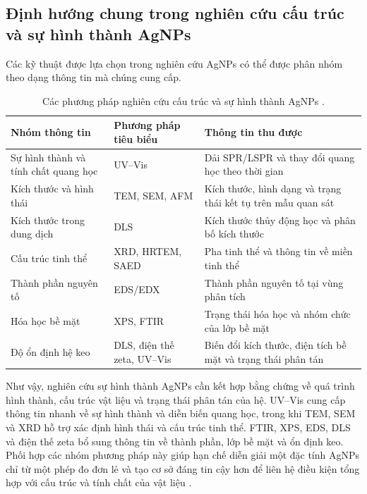 \subsection{Định hướng chung trong nghiên cứu cấu trúc và sự hình thành AgNPs}
Các kỹ thuật được lựa chọn trong nghiên cứu AgNPs có thể được phân nhóm theo dạng thông tin mà chúng cung cấp.
\begin{longtable}{@{}>{\raggedright\arraybackslash}p{}>{\raggedright\arraybackslash}p{}>{\raggedright\arraybackslash}p{}@{}}
\caption[Các phương pháp nghiên cứu cấu trúc và sự hình thành AgNPs]{Các phương pháp nghiên cứu cấu trúc và sự hình thành AgNPs \parencite{patil2021,pryshchepa2020,zhang2016}.}\\
Nhóm thông tin & Phương pháp tiêu biểu & Thông tin thu được \\
\hline
Sự hình thành và tính chất quang học & UV--Vis & Dải SPR/LSPR và thay đổi quang học theo thời gian \\
Kích thước và hình thái & TEM, SEM, AFM & Kích thước, hình dạng và trạng thái kết tụ trên mẫu quan sát \\
Kích thước trong dung dịch & DLS & Kích thước thủy động học và phân bố kích thước \\
Cấu trúc tinh thể & XRD, HRTEM, SAED & Pha tinh thể và thông tin về miền tinh thể \\
Thành phần nguyên tố & EDS/EDX & Thành phần nguyên tố tại vùng phân tích \\
Hóa học bề mặt & XPS, FTIR & Trạng thái hóa học và nhóm chức của lớp bề mặt \\
Độ ổn định hệ keo & DLS, điện thế zeta, UV--Vis & Biến đổi kích thước, điện tích bề mặt và trạng thái phân tán \\
\end{longtable}
\par
Như vậy, nghiên cứu sự hình thành AgNPs cần kết hợp bằng chứng về quá trình hình thành, cấu trúc vật liệu và trạng thái phân tán của hệ.
UV--Vis cung cấp thông tin nhanh về sự hình thành và diễn biến quang học, trong khi TEM, SEM và XRD hỗ trợ xác định hình thái và cấu trúc tinh thể.
FTIR, XPS, EDS, DLS và điện thế zeta bổ sung thông tin về thành phần, lớp bề mặt và ổn định keo.
Phối hợp các nhóm phương pháp này giúp hạn chế diễn giải một đặc tính AgNPs chỉ từ một phép đo đơn lẻ và tạo cơ sở đáng tin cậy hơn để liên hệ điều kiện tổng hợp với cấu trúc và tính chất của vật liệu \parencite{patil2021,pryshchepa2020}.

